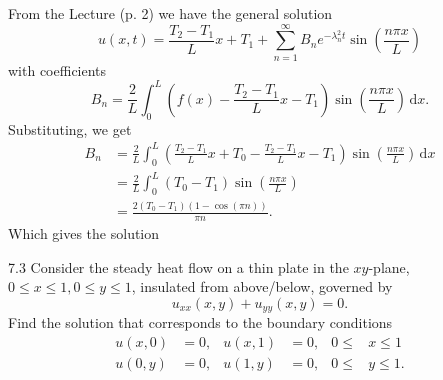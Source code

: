 \begin{derivation}
  From the Lecture (p. 2) we have the general solution
  \begin{equation*}
    u(x,t) = \frac{T_2 - T_1}{L}x + T_1 + \sum_{n = 1}^{\infty} B_n e^{-\lambda_n^2t} \sin \left( \frac{n \pi x}{L} \right)
  \end{equation*}
  with coefficients
  \begin{equation*}
    B_n = \frac{2}{L} \int_{0}^{L}  \left( f(x) - \frac{T_2 - T_1}{L}x - T_1 \right) \sin \left( \frac{n \pi x}{L} \right) \, \mathrm{d}x 
  .\end{equation*}
  Substituting, we get
  \begin{align*}
    B_n &= \frac{2}{L} \int_{0}^{L} \left( \frac{T_2 - T_1}{L} x + T_0 - \frac{T_2 - T_1}{L}x - T_1 \right) \sin \left( \frac{n \pi x}{L} \right) \, \mathrm{d}x \\
        &= \frac{2}{L} \int_{0}^{L} \left( T_0 - T_1 \right) \sin \left( \frac{n \pi x}{L} \right) \\
        &= \frac{2 \left( T_0 - T_1 \right) \left(1 - \cos (\pi n) \right)}{\pi n}
  .\end{align*}
  Which gives the solution
\end{derivation}


\begin{problem}{7.3}
  Consider the steady heat flow on a thin plate in the $xy$-plane, $0 \leq x \leq 1, 0 \leq y \leq 1$, insulated from above/below, governed by
  \[ 
  u_{x x}(x,y) + u_{yy}(x,y) = 0
  .\]
  Find the solution that corresponds to the boundary conditions
  \begin{align*}
    u(x,0) &= 0, & u(x,1) &= 0, & 0 \leq& x \leq 1 \\
    u(0,y) &= 0, & u(1,y) &= 0, & 0 \leq& y \leq 1
  .\end{align*}
\end{problem}

